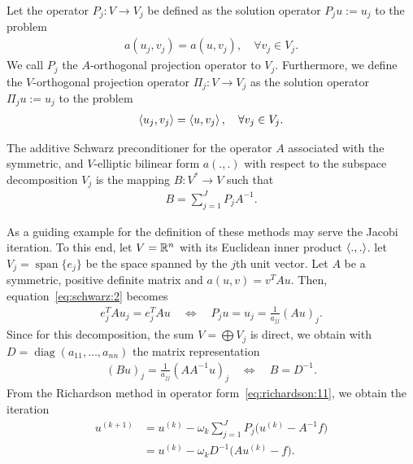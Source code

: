 \begin{definition}
  Let the operator $P_j: V \to V_j$ be defined as the solution
  operator $P_j u := u_j$ to the problem
  \begin{gather}
    \label{eq:schwarz:2}
    a(u_j,v_j) = a(u,v_j),\quad\forall v_j\in V_j.
  \end{gather}
  We call $P_j$ the $A$-orthogonal projection operator to
  $V_j$. Furthermore, we define the $V$-orthogonal projection operator
  $\Pi_j: V \to V_j$ as the solution operator $\Pi_j u := u_j$ to the problem
  \begin{gather}
    \label{eq:schwarz:3}
    \scal(u_j,v_j) = \scal(u,v_j),\quad\forall v_j\in V_j.
  \end{gather}
\end{definition}

\begin{definition}
  The additive Schwarz preconditioner for the operator $A$ associated
  with the symmetric, and $V$-elliptic bilinear form $a(.,.)$ with
  respect to the subspace decomposition $V_j$ is the mapping $B:
  V^*\to V$ such that
  \begin{gather}
    \label{eq:schwarz:4}
    B = \sum_{j=1}^J P_j A^{-1}.
  \end{gather}
\end{definition}

\begin{example}
  As a guiding example for the definition of these methods may serve
  the Jacobi iteration. To this end, let $V = \mathbb R^n$ with its Euclidean
  inner product $\scal(.,.)$. let $V_j = \operatorname{span}\{e_j\}$
  be the space spanned by the $j$th unit vector. Let $A$ be a
  symmetric, positive definite matrix and $a(u,v) = v^T A u$. Then,
  equation~\eqref{eq:schwarz:2} becomes
  \begin{gather*}
    e_j^T A u_j = e_j^T A u
    \quad \Leftrightarrow \quad
    P_j u = u_j = \frac1{a_{jj}}(A u)_j.
  \end{gather*}
  Since for this decomposition, the sum $V=\bigoplus V_j$ is direct,
  we obtain with $D=\operatorname{diag}(a_{11},\dots,a_{nn})$ the
  matrix representation
  \begin{gather*}
    (B u)_j = \frac1{a_{jj}}(A A^{-1} u)_j
    \quad \Leftrightarrow \quad
    B = D^{-1}.
  \end{gather*}
  From the Richardson method in operator
  form~\eqref{eq:richardson:11}, we obtain the iteration
  \begin{align*}
    u^{(k+1)} &= u^{(k)} - \omega_k \sum_{j=1}^J P_j \bigl(u^{(k)} -
    A^{-1}f\bigr)\\
    &= u^{(k)} - \omega_k D^{-1} \bigl(A u^{(k)} - f\bigr).
  \end{align*}
\end{example}

